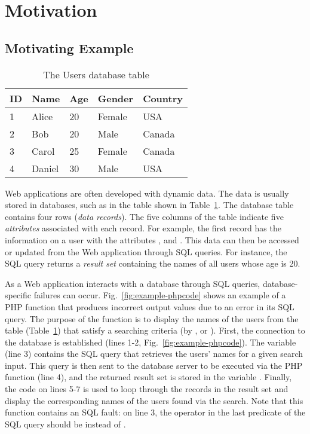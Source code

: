 \section{Motivation}

\subsection{Motivating Example}

\begin{table}
    \centering
    \footnotesize
    \caption{The \textsf{Users} database table}\label{tab:users-table}
\begin{tabular}{lllll}
  \addlinespace
  \toprule
  \textbf{ID} & \textbf{Name} & \textbf{Age} & \textbf{Gender} & \textbf{Country} \\
  \midrule
  1 & Alice & 20 & Female & USA \\
  2 & Bob & 20 & Male & Canada \\
  3 & Carol & 25 & Female & Canada \\
  4 & Daniel & 30 & Male & USA \\
  \bottomrule
\end{tabular}
\end{table}

Web applications are often developed with dynamic data. The data is
usually stored in databases, such as in the table shown in
Table~\ref{tab:users-table}. The  database table
contains four rows (\emph{data records}). The five columns of the
table indicate five \emph{attributes} associated with each record. For
example, the first record has the information on a user with
the attributes , and
. This data can then be accessed or updated from the
Web application through SQL queries. For instance, the SQL query
 returns a
\emph{result set} containing the names of all users whose age is
20.

As a Web application interacts with a database through SQL queries,
database-specific failures can occur. Fig.~\ref{fig:example-phpcode}
shows an example of a PHP function that produces incorrect output
values due to an error in its SQL query. The purpose of the function
is to display the names of the users from the  table
(Table~\ref{tab:users-table}) that satisfy a searching criteria (by
, or ). First, the connection to the
database is established (lines 1-2,
Fig.~\ref{fig:example-phpcode}). The  variable (line 3)
contains the SQL query that retrieves the users' names for a given
search input. This query is then sent to the database server to be
executed via the PHP function  (line 4), and the
returned result set is stored in the variable
. Finally, the code on lines 5-7 is used to loop
through the records in the result set and display the corresponding
names of the users found via the search. Note that this function
contains an SQL fault: on line 3, the operator in the last predicate
 of the SQL query should be 
instead of .

